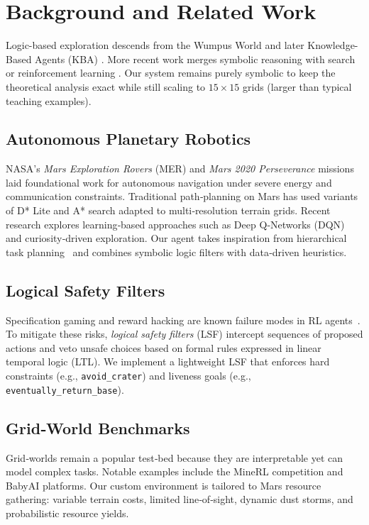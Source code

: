 \documentclass[12pt]{article}
\begin{document}


\section{Background and Related Work}\label{sec-background}


Logic-based exploration descends from the Wumpus World and later
Knowledge-Based Agents (KBA) \cite{genesereth1994kbagents}.  
More recent work merges symbolic reasoning with search \cite{zhang2021hybrid}
or reinforcement learning \cite{kulkarni2016hierarchical}.
Our system remains purely symbolic to keep the theoretical analysis exact
while still scaling to \(15\times15\) grids (larger than typical teaching
examples).

\subsection{Autonomous Planetary Robotics}
NASA's \emph{Mars Exploration Rovers} (MER) and \emph{Mars 2020 Perseverance} missions laid foundational work for autonomous navigation under severe energy and communication constraints.
Traditional path‑planning on Mars has used variants of D* Lite and A* search adapted to multi‑resolution terrain grids.
Recent research explores learning‑based approaches such as Deep Q‑Networks (DQN) and curiosity‑driven exploration.
Our agent takes inspiration from hierarchical task planning~\cite{gneiting2013hierarchical} and combines symbolic logic filters with data‑driven heuristics.

\subsection{Logical Safety Filters}
Specification gaming and reward hacking are known failure modes in RL agents~\cite{amodei2016concrete}.
To mitigate these risks, \emph{logical safety filters} (LSF) intercept sequences of proposed actions and veto unsafe choices based on
formal rules expressed in linear temporal logic (LTL).
We implement a lightweight LSF that enforces hard constraints (e.g., \texttt{avoid\_crater}) and liveness goals (e.g., \texttt{eventually\_return\_base}).

\subsection{Grid‑World Benchmarks}
Grid‑worlds remain a popular test‑bed because they are interpretable yet can model complex tasks.
Notable examples include the MineRL competition and BabyAI platforms.
Our custom environment is tailored to Mars resource gathering: variable terrain costs, limited line‑of‑sight, dynamic dust storms, and probabilistic resource yields.
\end{document}
